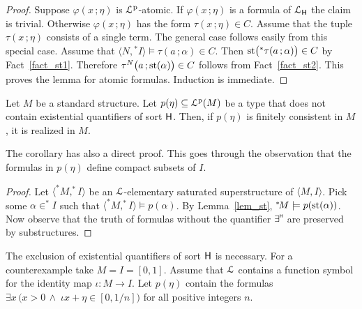 \documentclass{amsproc}
\begin{document}
\begin{proof}
  Suppose $\varphi(x\,;\eta)$ is ${\EuScript L}^{\rm p}$-atomic.
  If $\varphi(x\,;\eta)$ is a formula of ${\EuScript L}_{\sf H}$ the claim is trivial. 
  Otherwise $\varphi(x\,;\eta)$ has the form $\tau(x\,;\eta)\in C$.
  Assume that the tuple $\tau(x\,;\eta)$ consists of a single term.
  The general case follows easily from this special case. 
  Assume that $\langle N,{}^*\!\!I\rangle\models \tau(a\,;\alpha)\in C$.
  Then ${\rm st}\big({}^*\tau(a\,;\alpha)\big)\in C$ by Fact~\ref{fact_st1}.
  Therefore $\tau^N\big(a\,;{\rm st}(\alpha)\big)\in C$ follows from Fact~\ref{fact_st2}.
  This proves the lemma for atomic formulas.
  Induction is immediate. 
\end{proof}

\begin{corollary}\label{corol_st}
  Let $M$ be a standard structure.
  Let $p(\eta)\subseteq{\EuScript L}^{\rm p}(M)$ be a type that does not contain existential quantifiers of sort ${\sf H}$.
  Then, if $p(\eta)$ is finitely consistent in $M$, it is realized in $M$.
 \end{corollary}
 
 The corollary has also a direct proof.
 This goes through the observation that the formulas in $p(\eta)$ define compact subsets of $I$.

 \begin{proof}
  Let $\langle ^*\!M,^*\!\!I\rangle$ be an ${\EuScript L}$-elementary saturated superstructure of $\langle M,I\rangle$.
  Pick some $\alpha\in ^*\!\!I$ such that $\langle ^*\!M,^*\!\!I\rangle\models p(\alpha)$.
  By Lemma~\ref{lem_st}, $^*\!M\models p({\rm st}(\alpha))$.
  Now observe that the truth of formulas without the quantifier $\exists\raisebox{1.1ex}{\scaleto{\sf H}{.8ex}}$ are preserved by substructures.
 \end{proof}
 
 The exclusion of existential quantifiers of sort ${\sf H}$ is necessary.
 For a counterexample take $M=I=[0,1]$.
 Assume that ${\EuScript L}$ contains a function symbol for the identity map $\iota:M\to I$.
 Let $p(\eta)$ contain the formulas $\exists x\,\big(x>0\,\wedge\;\iota x+\eta\in[0,1/n]\big)$ for all positive integers $n$.

\end{document}
